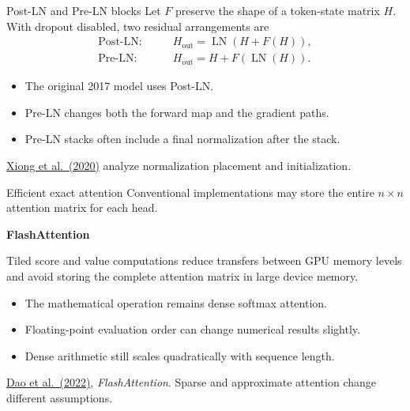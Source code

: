 \documentclass[aspectratio=169,11pt]{beamer}
\newcommand{\lead}[1]{{\color{ink}\bfseries #1}\par\vspace{1.2mm}}
\newcommand{\src}[1]{\par\vfill{\fontsize{7}{8.5}\selectfont\color{muted}#1}\par}
\DeclareMathOperator{\LN}{LN}
\begin{document}
\begin{frame}[t]{Post-LN and Pre-LN blocks}
Let $F$ preserve the shape of a token-state matrix $H$.
With dropout disabled, two residual arrangements are
\[
\begin{aligned}
 \text{Post-LN:}\qquad&H_{\mathrm{out}}=\LN(H+F(H)),\\[3mm]
 \text{Pre-LN:}\qquad&H_{\mathrm{out}}=H+F(\LN(H)).
\end{aligned}
\]
\begin{itemize}
  \item The original 2017 model uses Post-LN.
  \item Pre-LN changes both the forward map and the gradient paths.
  \item Pre-LN stacks often include a final normalization after the stack.
\end{itemize}
\src{\href{https://proceedings.mlr.press/v119/xiong20b.html}{Xiong et al.\ (2020)} analyze normalization placement and initialization.}
\end{frame}

\begin{frame}[t]{Efficient exact attention}
Conventional implementations may store the entire $n\times n$ attention
matrix for each head.
\par\vspace{3mm}
\lead{FlashAttention}
Tiled score and value computations reduce transfers between GPU memory
levels and avoid storing the complete attention matrix in large device memory.
\begin{itemize}
  \item The mathematical operation remains dense softmax attention.
  \item Floating-point evaluation order can change numerical results slightly.
  \item Dense arithmetic still scales quadratically with sequence length.
\end{itemize}
\src{\href{https://arxiv.org/abs/2205.14135}{Dao et al.\ (2022)}, \emph{FlashAttention}. Sparse and approximate attention change different assumptions.}
\end{frame}
\end{document}
